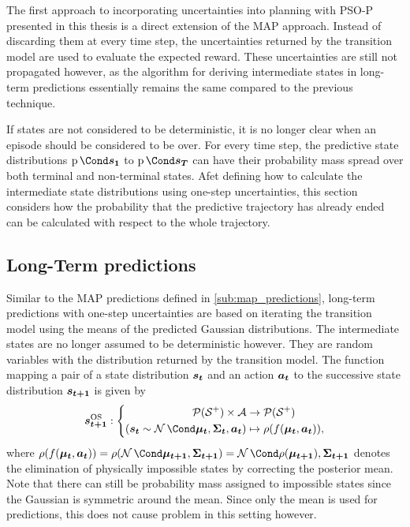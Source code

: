 The first approach to incorporating uncertainties into planning with PSO-P presented in this thesis is a direct extension of the MAP approach.
Instead of discarding them at every time step, the uncertainties returned by the transition model are used to evaluate the expected reward.
These uncertainties are still not propagated however, as the algorithm for deriving intermediate states in long-term predictions essentially remains the same compared to the previous technique.

If states are not considered to be deterministic, it is no longer clear when an episode should be considered to be over.
For every time step, the predictive state distributions $\Prob{\mat{s_1}}$ to $\Prob{\mat{s_T}}$ can have their probability mass spread over both terminal and non-terminal states.
Afet defining how to calculate the intermediate state distributions using one-step uncertainties, this section considers how the probability that the predictive trajectory has already ended can be calculated with respect to the whole trajectory.

\subsection{Long-Term predictions}
\label{sub:os_predictions}
Similar to the MAP predictions defined in \cref{sub:map_predictions}, long-term predictions with one-step uncertainties are based on iterating the transition model using the means of the predicted Gaussian distributions.
The intermediate states are no longer assumed to be deterministic however.
They are random variables with the distribution returned by the transition model.
The function mapping a pair of a state distribution $\bm{s_t}$ and an action $\bm{a_t}$ to the successive state distribution $\bm{s_{t+1}}$ is given by
\begin{align}
    \os{\mat{s_{t+1}}} : \left\{
        \begin{aligned}
            \Dists(\Es^+) \times \Ah &\to \Dists(\Es^+) \\
            (\mat{s_t} \sim \Gaussian{\mat{\mu_t}, \mat{\Sigma_t}}, \mat{a_t}) &\mapsto \squeeze(f(\mat{\mu_t}, \mat{a_t})),
    \end{aligned}
    \right.
\end{align}
where $\squeeze(f(\mat{\mu_t}, \mat{a_t})) = \squeeze(\Gaussian{\mat{\mu_{t+1}}, \mat{\Sigma_{t+1}}}) = \Gaussian{\squeeze(\mat{\mu_{t+1}}), \mat{\Sigma_{t+1}}}$ denotes the elimination of physically impossible states by correcting the posterior mean.
Note that there can still be probability mass assigned to impossible states since the Gaussian is symmetric around the mean.
Since only the mean is used for predictions, this does not cause problem in this setting however.

